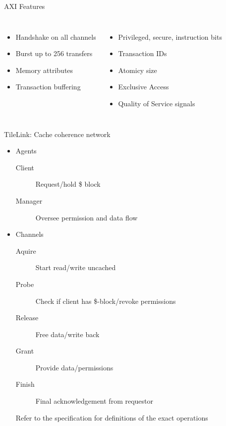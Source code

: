 \documentclass[]{beamer} %
\newenvironment{fullpage}[0]{%
	\begin{list}{}{%
		\setlength{\leftmargin}{-7mm}%
		\setlength{\rightmargin}{-7mm}%
		\vspace*{-10pt}
		}%
\item[]}{\end{list}}
\begin{document}
\begin{frame}{AXI Features}
		\begin{columns}
			\begin{itemize}
				\item Handshake on all channels
				\item Burst up to 256 transfers
				\item Memory attributes
				\item Transaction buffering
			\end{itemize}
			\begin{itemize}
				\item Privileged, secure, instruction bits
				\item Transaction IDs
				\item Atomicy size
				\item Exclusive Access
				\item Quality of Service signals
			\end{itemize}
		\end{columns}
\end{frame}



\begin{frame}{TileLink: Cache coherence network}
	\begin{itemize}
		\item Agents\\
			\begin{description}
				\item[Client] Request/hold \$ block
				\item[Manager] Oversee permission and data flow
			\end{description}
		\item Channels\\
			\begin{description}
				\item[Aquire] Start read/write uncached
				\item[Probe] Check if client has \$-block/revoke permissions
				\item[Release] Free data/write back
				\item[Grant] Provide data/permissions
				\item[Finish] Final acknowledgement from requestor
			\end{description}
			Refer to the specification for definitions of the exact operations
	\end{itemize}
\end{frame}
\end{document}
